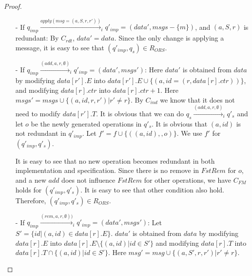 \begin {proof}
\begin{itemize}
    Since forgetting does not change visibility for the remanning operations, it is easy to see that $C_{\mathit{FM}}$ and $C_{\mathit{vis}}$ hold for $(q'_{\mathit{imp}},q'_s)$. It is obvious that $C_{\mathit{ind}}$ still holds for $(q'_{\mathit{imp}},q'_s)$. Therefore, $(q'_{\mathit{imp}},q'_s) \in R_{\mathit{ORS}}$.

\item[-] If $q_{\mathit{imp}} \xrightarrow{\mathit{apply}( \mathit{msg}=(a,S,r,r' ))}_i q'_{\mathit{imp}} = (\mathit{data}',\mathit{msgs} - \{ m \})$, and $(a,S,r)$ is redundant: By $C_{\mathit{rdt}}$, $\mathit{data}' = \mathit{data}$. Since the only change is applying a message, it is easy to see that $(q'_{\mathit{imp}},q_s) \in R_{\mathit{ORS}}$.

\item[-] If $q_{\mathit{imp}} \xrightarrow{(\mathit{add},a,r,\emptyset)}_i q'_{\mathit{imp}} = (\mathit{data}',\mathit{msgs}')$: Here $\mathit{data}'$ is obtained from $\mathit{data}$ by modifying $\mathit{data}[r'].E$ into $\mathit{data}[r'].E \cup \{ (a,\mathit{id} = (r,\mathit{data}[r].\mathit{ctr})) \}$, and modifying $\mathit{data}[r].\mathit{ctr}$ into $\mathit{data}[r].\mathit{ctr}+1$. Here $\mathit{msgs}' = \mathit{msgs} \cup \{ (a,\mathit{id},r,r') \vert r' \neq r \}$. By $C_{\mathit{ind}}$ we know that it does not need to modify $\mathit{data}[r'].T$. It is obvious that we can do $q_s \xrightarrow{( \mathit{add},a,r,\emptyset )}_i q'_s$ and let $o$ be the newly generated operations in $q'_s$. It is obvious that $(a,\mathit{id})$ is not redundant in $q'_{\mathit{imp}}$. Let $f' = f \cup \{ ((a,id),,o) \}$. We use $f'$ for $(q'_{\mathit{imp}},q'_s)$.

    It is easy to see that no new operation becomes redundant in both implementation and specification. Since there is no remove in $\mathit{FstRem}$ for $o$, and a new $\mathit{add}$ does not influence $\mathit{FstRem}$ for other operations, we have $C_{\mathit{FM}}$ holds for $(q'_{\mathit{imp}},q'_s)$. It is easy to see that other condition also hold. Therefore, $(q'_{\mathit{imp}},q'_s) \in R_{\mathit{ORS}}$.

\item[-] If $q_{\mathit{imp}} \xrightarrow{( \mathit{rem},a,r,\emptyset ))}_i q'_{\mathit{imp}} = (\mathit{data}',\mathit{msgs}')$: Let $S' = \{ \mathit{id} \vert (a,\mathit{id}) \in \mathit{data}[r].E \}$. $\mathit{data}'$ is obtained from $\mathit{data}$ by modifying $\mathit{data}[r].E$ into $\mathit{data}[r].E \setminus \{ (a,\mathit{id}) \vert \mathit{id} \in S'\}$ and modifying $\mathit{data}[r].T$ into $\mathit{data}[r].T \cap \{ (a,\mathit{id}) \vert \mathit{id} \in S'\}$. Here $\mathit{msg}' = \mathit{msg} \cup \{ (a,S',r,r') \vert r' \neq r \}$.


\end{itemize}
\end{proof}
